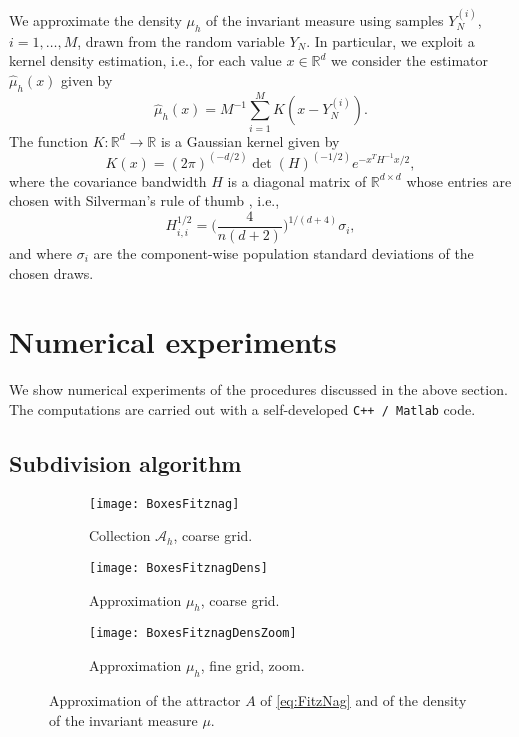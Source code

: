 \documentclass{siamart1116}
\numberwithin{theorem}{section}
\newcommand{\ttt}{\texttt}
\newcommand{\R}{\mathbb{R}}
\newcommand{\sksum}{\textstyle\sum}
\begin{document}
We approximate the density $\mu_h$ of the invariant measure using samples $Y_N^{(i)}$, $i = 1, \ldots, M$, drawn from the random variable $Y_N$. In particular, we exploit a kernel density estimation, i.e., for each value $x \in \R^d$ we consider the estimator $\hat \mu_h(x)$ given by
\begin{equation}
\hat \mu_h(x) = M^{-1}\sksum_{i=1}^{M} K(x - Y_N^{(i)}).
\end{equation}
The function $K\colon\R^d\to\R$ is a Gaussian kernel given by 
\begin{equation}
K(x) = (2\pi)^{(-d/2)}\det(H)^{(-1/2)}e^{-x^TH^{-1}x/2},
\end{equation}
where the covariance bandwidth $H$ is a diagonal matrix of $\R^{d\times d}$ whose entries are chosen with Silverman's rule of thumb \cite{Sil86}, i.e.,
\begin{equation}
H_{i,i}^{1/2} = \Big(\frac{4}{n(d + 2)}\Big) ^ {1 / (d + 4)} \sigma_i,
\end{equation}
and where $\sigma_i$ are the component-wise population standard deviations of the chosen draws.

\section{Numerical experiments} 
We show numerical experiments of the procedures discussed in the above section. The computations are carried out with a self-developed \ttt{C++ / Matlab} code.
\subsection{Subdivision algorithm} 
\begin{figure}[t]
	\begin{center} 
		\begin{subfigure}[b]{0.49\textwidth}
			\texttt{[image: BoxesFitznag]}
			\caption{Collection $\mathcal{A}_h$, coarse grid.}
			\label{fig:FitzNagBoxesA}
		\end{subfigure}	
		\begin{subfigure}[b]{0.49\textwidth}
			\texttt{[image: BoxesFitznagDens]}
			\caption{Approximation $\mu_h$, coarse grid.}
			\label{fig:FitzNagBoxesB}
		\end{subfigure}
		\begin{subfigure}[b]{0.49\textwidth}
			\texttt{[image: BoxesFitznagDensZoom]}
			\caption{Approximation $\mu_h$, fine grid, zoom.}
			\label{fig:FitzNagBoxesC}
		\end{subfigure} 
	\end{center}
	\caption{Approximation of the attractor $A$ of \eqref{eq:FitzNag} and of the density of the invariant measure $\mu$.}
	\label{fig:FitzNagBoxes}
\end{figure}
\end{document}
